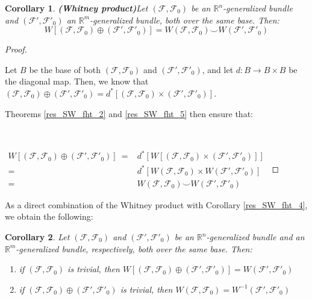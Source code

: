 \documentclass[12pt,oneside]{book}
\newtheorem{cor}    {Corollary}[chapter]
\newcommand{\R}{\mathbb{R}}
\newcommand{\ccup}{\smile}
\begin{document}
    \begin{cor}{\bf (Whitney product)}\label{res_SW_fht_6}
	Let $(\mathcal{F},\mathcal{F}_{0})$ be an $\R^{n}$-generalized bundle and $(\mathcal{F'},\mathcal{F'}_{0})$ an $\R^{m}$-generalized bundle, 
    both over the same base. Then:
	$$ W[(\mathcal{F},\mathcal{F}_{0})\oplus (\mathcal{F'},\mathcal{F'}_{0})]=W(\mathcal{F},\mathcal{F}_{0})\ccup W(\mathcal{F'},\mathcal{F'}_{0}) $$
    \end{cor}
    \begin{proof}

        \

    	Let $B$ be the base of both $(\mathcal{F},\mathcal{F}_{0})$ and $(\mathcal{F'},\mathcal{F'}_{0})$, and let $d:B\to B\times B$ be the 
        diagonal map. Then, we know that 
        $(\mathcal{F},\mathcal{F}_{0})\oplus (\mathcal{F'},\mathcal{F'}_{0})=d^{*}[(\mathcal{F},\mathcal{F}_{0})\times (\mathcal{F'},\mathcal{F'}_{0})]$.

    	Theorems \ref{res_SW_fht_2} and \ref{res_SW_fht_5} then ensure that:

        \

        $\begin{array}{rl}
    		W[(\mathcal{F},\mathcal{F}_{0})\oplus (\mathcal{F'},\mathcal{F'}_{0})] \ = & d^{*}[W[(\mathcal{F},\mathcal{F}_{0})\times (\mathcal{F'},\mathcal{F'}_{0})]] \\
    		= & d^{*}[W(\mathcal{F},\mathcal{F}_{0})\times W(\mathcal{F'},\mathcal{F'}_{0})] \\
    		= & W(\mathcal{F},\mathcal{F}_{0})\ccup W(\mathcal{F'},\mathcal{F'}_{0})
    	\end{array}$

    \end{proof}

    As a direct combination of the Whitney product with Corollary \ref{res_SW_fht_4}, we obtain the following:

    \begin{cor}\label{res_SW_fht_7}
    	Let $(\mathcal{F},\mathcal{F}_{0})$ and $(\mathcal{F'},\mathcal{F'}_{0})$ be an $\R^{n}$-generalized bundle and an $\R^{m}$-generalized 
        bundle, respectively, both over the same base. Then:
    	\begin{enumerate}
    		\item if $(\mathcal{F},\mathcal{F}_{0})$ is trivial, then 
            $W[(\mathcal{F},\mathcal{F}_{0})\oplus (\mathcal{F'},\mathcal{F'}_{0})]=W(\mathcal{F'},\mathcal{F'}_{0})$
    		\item if $(\mathcal{F},\mathcal{F}_{0})\oplus (\mathcal{F'},\mathcal{F'}_{0})$ is trivial, then 
            $W(\mathcal{F},\mathcal{F}_{0})=W^{-1}(\mathcal{F'},\mathcal{F'}_{0})$
    	\end{enumerate}
    \end{cor}
\end{document}

